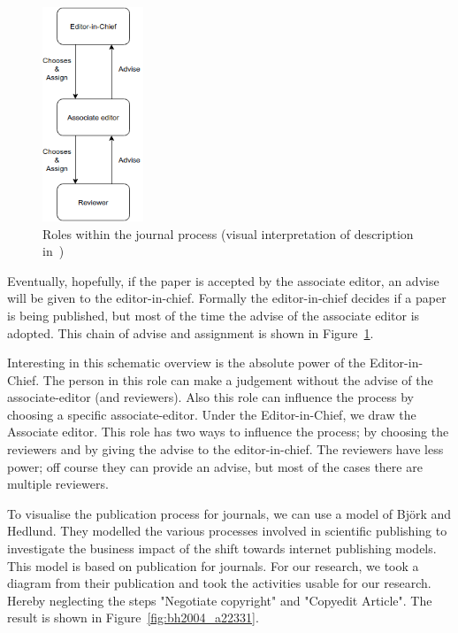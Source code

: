 \documentclass{ou-report}
\newcommand{\outline}[1]{{\color{blue} #1}}
\begin{document}
\begin{figure}
    \centering
    \includegraphics[width=0.27\textwidth]{images/c2013.drawio.png}
    \caption{Roles within the journal process (visual interpretation of description in~\cite{C2013})}
    \label{fig:c2013}
\end{figure}

Eventually, hopefully, if the paper is accepted by the associate editor, an 
advise will be given to the editor-in-chief. Formally the editor-in-chief 
decides if a paper is being published, but most of the time the advise of the 
associate editor is adopted. This chain of advise and assignment is shown in 
Figure~\ref{fig:c2013}. 

Interesting in this schematic overview is the absolute 
power of the Editor-in-Chief. The person in this role can make a judgement without the advise of the 
associate-editor (and reviewers). Also this role can influence the process by 
choosing a specific associate-editor. Under the Editor-in-Chief, we draw the 
Associate editor. This role has two ways to influence the process; by choosing 
the reviewers and by giving the advise to the editor-in-chief. The reviewers 
have less power; off course they can provide an advise, but most of the cases 
there are multiple reviewers.


To visualise the publication process for journals, we can use a model of 
Bj\"ork and Hedlund. They modelled the various processes involved in scientific
publishing to investigate the business impact of the shift towards internet
publishing models. This model is based on publication for journals.
For our research, we took a diagram from their publication and took the 
activities usable for our research. Hereby neglecting the steps 
"Negotiate copyright" and "Copyedit Article". The result is shown in 
Figure~\ref{fig:bh2004_a22331}.
\end{document}
